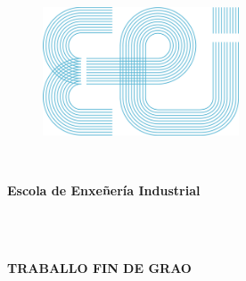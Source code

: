 \documentclass[11pt,twoside]{book}
\begin{document}
\stopcontents[parts]
\cleardoublepage
\pagestyle{empty}
\renewcommand{\documento}{ORZAMENTO}

\begin{center}
\begin{figure}[htbp]
\begin{center}
\includegraphics[angle=0, height=3.8cm]{images/EEILogo.png}
\end{center}
\end{figure}
\ \\
\begin{large}
\begin{center}
\color{blue}\textbf{Escola de Enxeñería Industrial}
\end{center}
\end{large}
\ \\
\ \\
\begin{large}
\begin{center}
\textbf{TRABALLO FIN DE GRAO}
\end{center}
\end{large}
\ \\
\ \\
\begin{large}
\begin{center}
{\titulouno}
\end{center}
\end{large}
\ \\
\ \\
\begin{normalsize}

\end{normalsize}
\end{center}
\end{document}
